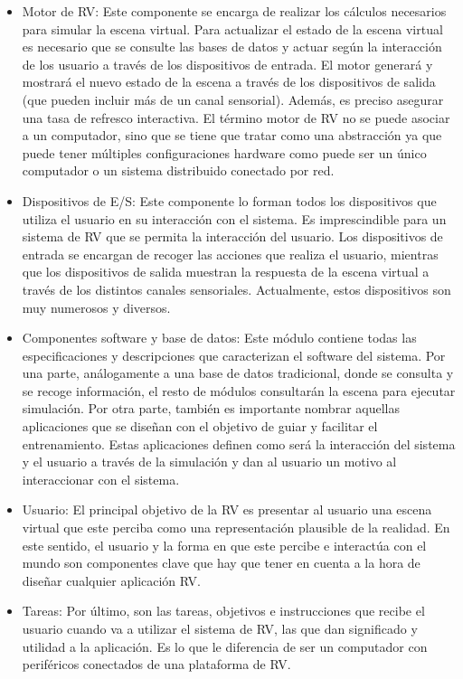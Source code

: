 \begin{itemize}
    \item Motor de \ac{RV}: Este componente se encarga de realizar los cálculos necesarios para simular la escena virtual. Para actualizar el estado de la escena virtual es necesario que se consulte las bases de datos  y actuar según la interacción de los usuario a través de los dispositivos de entrada. El motor generará y mostrará el nuevo estado de la escena a través de los dispositivos de salida (que pueden incluir más de un canal sensorial). Además, es preciso asegurar una tasa de refresco interactiva. El término motor de \ac{RV} no se puede asociar a un computador, sino que se tiene que tratar como una abstracción ya que puede tener múltiples configuraciones hardware como puede ser un único computador o un sistema distribuido conectado por red.
    \item Dispositivos de \ac{E/S}: Este componente lo forman todos los dispositivos que utiliza el usuario en su interacción con el sistema. Es imprescindible para un sistema de \ac{RV}  que se permita la interacción del usuario. Los dispositivos de entrada se encargan de recoger las acciones que realiza el usuario, mientras que los dispositivos de salida muestran la respuesta de la escena virtual a través de los distintos canales sensoriales. Actualmente, estos dispositivos son muy numerosos y diversos.
    \item Componentes software y base de datos: Este módulo contiene todas las especificaciones y descripciones que caracterizan el software del sistema. Por una parte, análogamente a una base de datos tradicional, donde se consulta y se recoge información, el resto de módulos consultarán la escena para ejecutar simulación.
    Por otra parte, también es importante nombrar aquellas aplicaciones que se diseñan con el objetivo de guiar y facilitar el entrenamiento. Estas aplicaciones definen como será la interacción del sistema y el usuario a través de la simulación y dan al usuario un motivo al interaccionar con el sistema.%
    \item Usuario: El principal objetivo de la \ac{RV} es presentar al usuario una escena virtual que este perciba como una representación plausible de la realidad. En este sentido, el usuario y la forma en que este percibe e interactúa con el mundo son componentes clave que hay que tener en cuenta a la hora de diseñar cualquier aplicación \ac{RV}.
    \item Tareas: Por último, son las tareas, objetivos e instrucciones que recibe el usuario cuando va a utilizar el sistema de \ac{RV}, las que dan significado y utilidad a la aplicación. Es lo que le diferencia de ser un computador con periféricos conectados de una plataforma de \ac{RV}.
\end{itemize}


